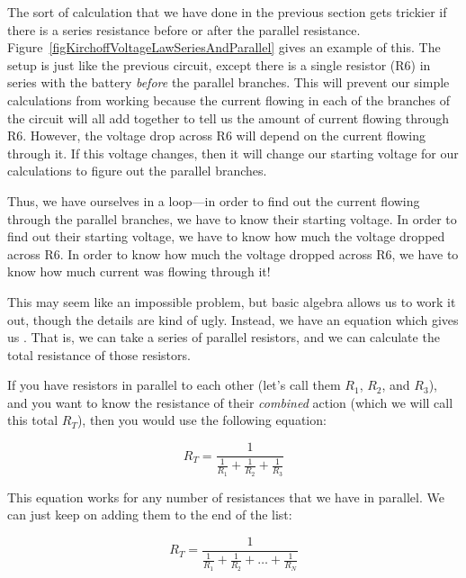 The sort of calculation that we have done in the previous section gets trickier if there is a series resistance before or after the parallel resistance.
Figure~\ref{figKirchoffVoltageLawSeriesAndParallel} gives an example of this.
The setup is just like the previous circuit, except there is a single resistor (R6) in series with the battery \emph{before} the parallel branches.
This will prevent our simple calculations from working because the current flowing in each of the branches of the circuit will all add together to tell us the amount of current flowing through R6.
However, the voltage drop across R6 will depend on the current flowing through it.
If this voltage changes, then it will change our starting voltage for our calculations to figure out the parallel branches.


Thus, we have ourselves in a loop---in order to find out the current flowing through the parallel branches, we have to know their starting voltage.
In order to find out their starting voltage, we have to know how much the voltage dropped across R6.
In order to know how much the voltage dropped across R6, we have to know how much current was flowing through it!

This may seem like an impossible problem, but basic algebra allows us to work it out, though the details are kind of ugly.
Instead, we have an equation which gives us .
That is, we can take a series of parallel resistors, and we can calculate the total resistance of those resistors.

If you have resistors in parallel to each other (let's call them $R_1$, $R_2$, and $R_3$), and you want to know the resistance of their \emph{combined} action (which we will call this total $R_T$), then you would use the following equation:

\begin{equation}
\label{eqparallelresistancethree}
R_T = \frac{1}{\frac{1}{R_1} + \frac{1}{R_2} + \frac{1}{R_3}}
\end{equation}

This equation works for any number of resistances that we have in parallel.
We can just keep on adding them to the end of the list:

\begin{equation}
\label{eqparallelresistancen}
R_T = \frac{1}{\frac{1}{R_1} + \frac{1}{R_2} + \ldots + \frac{1}{R_N}}
\end{equation}


